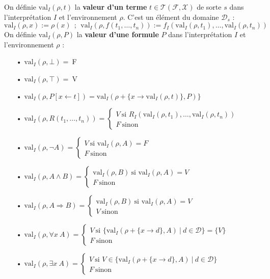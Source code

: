 \documentclass[11pt,a4paper]{article}
\begin{document}
On définie $\text{val}_I(\rho,t)$ la \textbf{valeur d'un terme} $t \in \mathcal{T}(\mathcal{F},\mathcal{X})$ de sorte $s$ dans l'interprétation $I$ et l'environnement $\rho$. C'est un élément du domaine $\mathcal{D}_s$ : \[\text{val}_I(\rho,x):=\rho(x) \ \ ; \ \ \text{val}_I(\rho,f(t_1,\dots,t_n)):=f_I(\text{val}_I(\rho,t_1),\dots,\text{val}_I(\rho,t_n))\]
On définie $\text{val}_I(\rho,P)$ la \textbf{valeur d'une formule} $P$ dans l'interprétation $I$ et l'environnement $\rho$ :
\begin{itemize}
\item[•]$\text{val}_I(\rho,\bot) =\ $F
\item[•]$\text{val}_I(\rho,\top) =\ $V
\item[•]$\text{val}_I(\rho,P[x \leftarrow t]) = \text{val}_I(\rho+\{x \to \text{val}_I(\rho,t)\},P) \} $
\item[•]$\text{val}_I(\rho,R(t_1,\dots,t_n)) = \begin{cases} V \ \text{si } R_I(\text{val}_I(\rho,t_1),\dots,\text{val}_I(\rho,t_n)) \\ F \ \text{sinon} \end{cases} $
\item[•]$\text{val}_I(\rho,\lnot A) = \begin{cases} V \ \text{si } \text{val}_I(\rho,A) = F \\ F \ \text{sinon} \end{cases} $
\item[•]$\text{val}_I(\rho,A \land B) = \begin{cases} \text{val}_I(\rho,B) \ \text{si } \text{val}_I(\rho,A) = V \\ F \ \text{sinon} \end{cases} $
\item[•]$\text{val}_I(\rho,A \Rightarrow B) = \begin{cases} \text{val}_I(\rho,B) \ \text{si } \text{val}_I(\rho,A) = V \\ V \ \text{sinon} \end{cases} $
\item[•]$\text{val}_I(\rho,\forall x \ A) = \begin{cases} V \ \text{si } \{\text{val}_I(\rho+\{x \to d\},A) \ | \ d \in \mathcal{D} \} = \{V\} \\ F \ \text{sinon} \end{cases} $
\item[•]$\text{val}_I(\rho,\exists x \ A) = \begin{cases} V \ \text{si } V \in \{\text{val}_I(\rho+\{x \to d\},A) \ | \ d \in \mathcal{D} \} \\ F \ \text{sinon} \end{cases} $
\end{itemize} 
\end{document}
